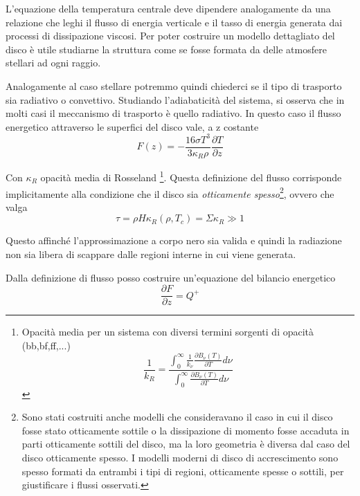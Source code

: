 \documentclass[a4paperbi]{article}
\begin{document}
	L'equazione della temperatura centrale deve dipendere analogamente da una relazione che leghi il flusso di energia verticale e il tasso di energia generata dai processi di dissipazione viscosi. Per poter costruire un modello dettagliato del disco è utile studiarne la struttura come se fosse formata da delle atmosfere stellari ad ogni raggio. 
	
	Analogamente al caso stellare potremmo quindi chiederci se il tipo di trasporto sia  radiativo o convettivo. Studiando l'adiabaticità del sistema, si osserva che in molti casi il meccanismo di trasporto è quello radiativo. In questo caso il flusso energetico attraverso le superfici del disco vale, a z costante
	\begin{equation}
		F(z)=-\frac{16\sigma T^3}{3\kappa_R\rho}\frac{\partial T}{\partial z}
	\end{equation}
	
	Con $\kappa_R$ opacità media di Rosseland
	\footnote{Opacità media per un sistema con diversi termini sorgenti di opacità (bb,bf,ff,...)\begin{equation}
																							\frac{1}{k_R}=\frac{\int_0^\infty\frac{1}{k_\nu}\frac{\partial B_\nu(T)}{\partial T}d\nu}{\int_0^\infty\frac{\partial B_\nu(T)}{\partial T}d\nu}
																						\end{equation}}.
Questa definizione del flusso corrisponde implicitamente alla condizione che il disco sia \textit{otticamente spesso}\footnote{Sono stati costruiti anche modelli che consideravano il caso in cui il disco fosse stato otticamente sottile o la dissipazione di momento fosse accaduta in parti otticamente sottili del disco, ma la loro geometria è diversa dal caso del disco otticamente spesso. I modelli moderni di disco di accrescimento sono spesso formati da entrambi i tipi di regioni, otticamente spesse o sottili, per giustificare i flussi osservati.}, ovvero che valga
	\begin{equation}
		\tau=\rho H\kappa_R(\rho,T_c)=\Sigma\kappa_R\gg 1
	\end{equation}
	
	Questo affinché l'approssimazione a corpo nero sia valida e quindi la radiazione non sia libera di scappare dalle regioni interne in cui viene generata.
	
	Dalla definizione di flusso posso costruire un'equazione del bilancio energetico
	\begin{equation}
		\frac{\partial F}{\partial z}=Q^+
	\end{equation}
\end{document}
